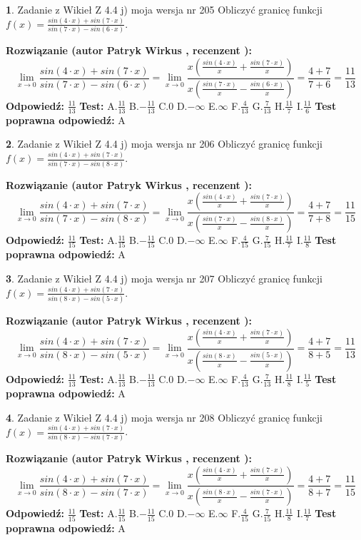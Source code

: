 \documentclass[12pt, a4paper]{article}
\theoremstyle{definition} %
\newtheorem{zad}{}
\newcommand{\zadStart}[1]{\begin{zad}#1\newline}
\newcommand{\zadStop}{\end{zad}}
\newcommand{\rozwStart}[2]{\noindent \textbf{Rozwiązanie (autor #1 , recenzent #2): }\newline}
\newcommand{\rozwStop}{\newline}
\newcommand{\odpStart}{\noindent \textbf{Odpowiedź:}\newline}
\newcommand{\odpStop}{\newline}
\newcommand{\testStart}{\noindent \textbf{Test:}\newline}
\newcommand{\testStop}{\newline}
\newcommand{\kluczStart}{\noindent \textbf{Test poprawna odpowiedź:}\newline}
\newcommand{\kluczStop}{\newline}
\begin{document}
\zadStart{Zadanie z Wikieł Z 4.4 j) moja wersja nr 205}
Obliczyć granicę funkcji $f(x)=\frac{sin(4\cdot x) +sin(7\cdot x)}{sin(7\cdot x) -sin(6\cdot x)}$.
\zadStop
\rozwStart{Patryk Wirkus}{}
$$\lim\limits_{x\to 0}\frac{sin(4\cdot x) +sin(7\cdot x)}{sin(7\cdot x) -sin(6\cdot x)}=\lim\limits_{x\to 0}\frac{x(\frac{sin(4\cdot x)}{x}+\frac{sin(7\cdot x)}{x})}{x(\frac{sin(7\cdot x)}{x}-\frac{sin(6\cdot x)}{x})}=\frac{4+7}{7+6} = \frac{11}{13}$$
\rozwStop
\odpStart
$\frac{11}{13}$
\odpStop
\testStart
A.$\frac{11}{13}$
B.$-\frac{11}{13}$
C.$0$
D.$-\infty$
E.$\infty$
F.$\frac{4}{13}$
G.$\frac{7}{13}$
H.$\frac{11}{7}$
I.$\frac{11}{6}$
\testStop
\kluczStart
A
\kluczStop



\zadStart{Zadanie z Wikieł Z 4.4 j) moja wersja nr 206}
Obliczyć granicę funkcji $f(x)=\frac{sin(4\cdot x) +sin(7\cdot x)}{sin(7\cdot x) -sin(8\cdot x)}$.
\zadStop
\rozwStart{Patryk Wirkus}{}
$$\lim\limits_{x\to 0}\frac{sin(4\cdot x) +sin(7\cdot x)}{sin(7\cdot x) -sin(8\cdot x)}=\lim\limits_{x\to 0}\frac{x(\frac{sin(4\cdot x)}{x}+\frac{sin(7\cdot x)}{x})}{x(\frac{sin(7\cdot x)}{x}-\frac{sin(8\cdot x)}{x})}=\frac{4+7}{7+8} = \frac{11}{15}$$
\rozwStop
\odpStart
$\frac{11}{15}$
\odpStop
\testStart
A.$\frac{11}{15}$
B.$-\frac{11}{15}$
C.$0$
D.$-\infty$
E.$\infty$
F.$\frac{4}{15}$
G.$\frac{7}{15}$
H.$\frac{11}{7}$
I.$\frac{11}{8}$
\testStop
\kluczStart
A
\kluczStop



\zadStart{Zadanie z Wikieł Z 4.4 j) moja wersja nr 207}
Obliczyć granicę funkcji $f(x)=\frac{sin(4\cdot x) +sin(7\cdot x)}{sin(8\cdot x) -sin(5\cdot x)}$.
\zadStop
\rozwStart{Patryk Wirkus}{}
$$\lim\limits_{x\to 0}\frac{sin(4\cdot x) +sin(7\cdot x)}{sin(8\cdot x) -sin(5\cdot x)}=\lim\limits_{x\to 0}\frac{x(\frac{sin(4\cdot x)}{x}+\frac{sin(7\cdot x)}{x})}{x(\frac{sin(8\cdot x)}{x}-\frac{sin(5\cdot x)}{x})}=\frac{4+7}{8+5} = \frac{11}{13}$$
\rozwStop
\odpStart
$\frac{11}{13}$
\odpStop
\testStart
A.$\frac{11}{13}$
B.$-\frac{11}{13}$
C.$0$
D.$-\infty$
E.$\infty$
F.$\frac{4}{13}$
G.$\frac{7}{13}$
H.$\frac{11}{8}$
I.$\frac{11}{5}$
\testStop
\kluczStart
A
\kluczStop



\zadStart{Zadanie z Wikieł Z 4.4 j) moja wersja nr 208}
Obliczyć granicę funkcji $f(x)=\frac{sin(4\cdot x) +sin(7\cdot x)}{sin(8\cdot x) -sin(7\cdot x)}$.
\zadStop
\rozwStart{Patryk Wirkus}{}
$$\lim\limits_{x\to 0}\frac{sin(4\cdot x) +sin(7\cdot x)}{sin(8\cdot x) -sin(7\cdot x)}=\lim\limits_{x\to 0}\frac{x(\frac{sin(4\cdot x)}{x}+\frac{sin(7\cdot x)}{x})}{x(\frac{sin(8\cdot x)}{x}-\frac{sin(7\cdot x)}{x})}=\frac{4+7}{8+7} = \frac{11}{15}$$
\rozwStop
\odpStart
$\frac{11}{15}$
\odpStop
\testStart
A.$\frac{11}{15}$
B.$-\frac{11}{15}$
C.$0$
D.$-\infty$
E.$\infty$
F.$\frac{4}{15}$
G.$\frac{7}{15}$
H.$\frac{11}{8}$
I.$\frac{11}{7}$
\testStop
\kluczStart
A
\kluczStop
\end{document}
